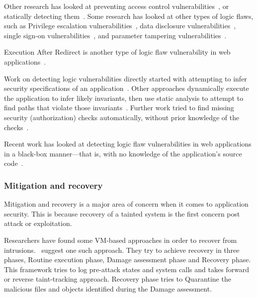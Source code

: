 \documentclass[11pt,letterpaper]{article}
\begin{document}
Other research has looked at preventing access control
vulnerabilities~\cite{dalton09:nemesis}, or statically detecting
them~\cite{sun2011}.
Some research has looked at other types of logic
flaws, such as
Privilege escalation vulnerabilities~\cite{monshizadeh2014}, data disclosure
vulnerabilities~\cite{muthukumaran2015}, single sign-on vulnerabilities~\cite{zhou2014}, and parameter tampering vulnerabilities~\cite{bisht2010, bisht2011}.

Execution After Redirect is another type of logic flaw
vulnerability in web applications~\cite{doupe2011, payet2013}.

Work on detecting logic vulnerabilities directly started with
attempting to infer security specifications of an
application~\cite{tan08:autoises, Livshits2009a}. Other approaches dynamically
execute the application to infer likely invariants, then use static
analysis to attempt to find paths that violate those
invariants~\cite{felmetsger10:logic}. Further work tried to find missing
security (authorization) checks automatically, without prior knowledge
of the checks~\cite{son2011, son2013}.

Recent work has looked at detecting logic flaw vulnerabilities in web
applications in a black-box manner---that is, with no knowledge of the
application's source code~\cite{pellegrino2014}.


\subsubsection{Mitigation and recovery}

Mitigation and recovery is a major area of concern when it comes to application security. 
This is because recovery of a tainted system is the first concern post attack or exploitation.

Researchers have found some VM-based approaches in order to recover from intrusions.~\cite{zhang2009b} suggest one such approach. They try to achieve recovery in three phases, Routine execution phase, Damage assessment phase and Recovery phase. This framework tries to log pre-attack states and system calls and takes forward or reverse taint-tracking approach. Recovery phase tries to Quarantine the malicious files and objects identified during the Damage assessment.
\end{document}
